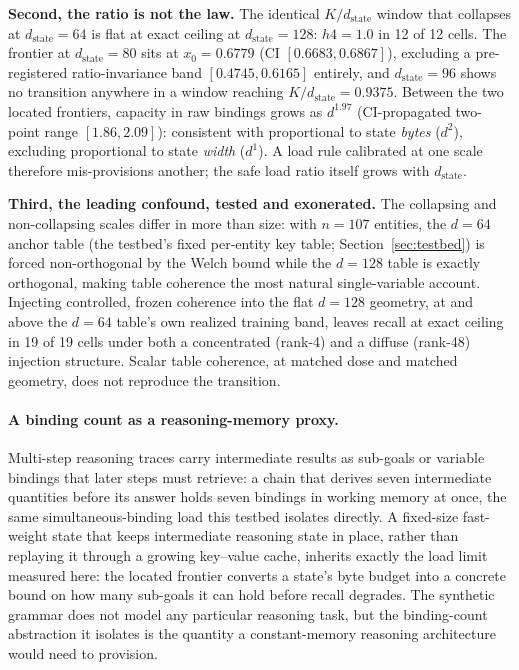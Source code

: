 \textbf{Second, the ratio is not the law.} The identical
$K/d_{\mathrm{state}}$ window that collapses at $d_{\mathrm{state}}=64$ is
flat at exact ceiling at $d_{\mathrm{state}}=128$: $h4=1.0$ in 12 of 12
cells. %
The frontier at $d_{\mathrm{state}}=80$ sits at $x_0 = 0.6779$ (CI
$[0.6683, 0.6867]$), excluding a pre-registered ratio-invariance band
$[0.4745, 0.6165]$ entirely, %
and $d_{\mathrm{state}}=96$ shows no transition anywhere in a window
reaching $K/d_{\mathrm{state}} = 0.9375$. %
Between the two located frontiers, capacity in raw bindings grows as
$d^{1.97}$ (CI-propagated two-point range $[1.86, 2.09]$): consistent with
proportional to state \emph{bytes} ($d^2$), excluding proportional to
state \emph{width} ($d^1$). %
A load rule calibrated at one scale therefore mis-provisions another;
the safe load ratio itself grows with $d_{\mathrm{state}}$.

\textbf{Third, the leading confound, tested and exonerated.} The collapsing
and non-collapsing scales differ in more than size: with $n=107$ entities,
the $d=64$ anchor table (the testbed's fixed per-entity key table;
Section~\ref{sec:testbed}) is forced non-orthogonal by the Welch bound while
the $d=128$ table is exactly orthogonal, making table coherence the most
natural single-variable account. Injecting controlled, frozen coherence
into the flat $d=128$ geometry, at and above the $d=64$ table's own
realized training band, leaves recall at exact ceiling in 19 of 19 cells
under both a concentrated (rank-4) and a diffuse (rank-48) injection
structure. %
Scalar table coherence, at matched dose and matched geometry, does not
reproduce the transition.

\paragraph{A binding count as a reasoning-memory proxy.} Multi-step
reasoning traces carry intermediate results as sub-goals or variable
bindings that later steps must retrieve: a chain that derives seven
intermediate quantities before its answer holds seven bindings in
working memory at once, the same simultaneous-binding load this testbed
isolates directly. A fixed-size fast-weight state that keeps
intermediate reasoning state in place, rather than replaying it through
a growing key--value cache, inherits exactly the load limit measured
here: the located frontier converts a state's byte budget into a
concrete bound on how many sub-goals it can hold before recall
degrades. The synthetic grammar does not model any particular reasoning
task, but the binding-count abstraction it isolates is the quantity a
constant-memory reasoning architecture would need to provision.

